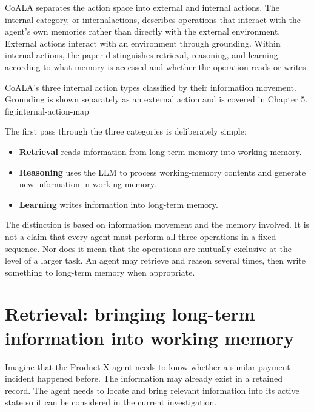 CoALA separates the action space into external and internal actions. The internal category, or \glspl{internalaction}, describes operations that interact with the agent’s own memories rather than directly with the external environment. External actions interact with an environment through grounding. Within internal actions, the paper distinguishes \gls{retrieval}, \gls{reasoning}, and \gls{learning} according to what memory is accessed and whether the operation reads or writes.

  {CoALA's three internal action types classified by their information movement. Grounding is shown separately as an external action and is covered in Chapter 5.}
  {fig:internal-action-map}

The first pass through the three categories is deliberately simple:

\begin{itemize}
  \item \textbf{Retrieval} reads information from long-term memory into working memory.
  \item \textbf{Reasoning} uses the LLM to process working-memory contents and generate new information in working memory.
  \item \textbf{Learning} writes information into long-term memory.
\end{itemize}

The distinction is based on information movement and the memory involved. It is not a claim that every agent must perform all three operations in a fixed sequence. Nor does it mean that the operations are mutually exclusive at the level of a larger task. An agent may retrieve and reason several times, then write something to long-term memory when appropriate.

\section{Retrieval: bringing long-term information into working memory}
\label{sec:retrieval}

Imagine that the Product X agent needs to know whether a similar payment incident happened before. The information may already exist in a retained record. The agent needs to locate and bring relevant information into its active state so it can be considered in the current investigation.

